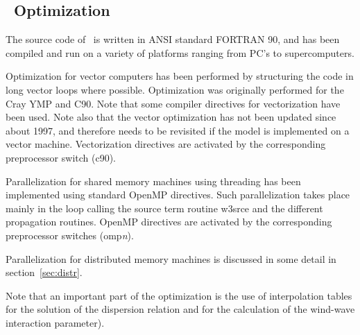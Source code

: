 

\vssub
\subsection{~Optimization} \label{sec:optim}
\vssub

The source code of \ws\ is written in ANSI standard FORTRAN 90, and has been
compiled and run on a variety of platforms ranging from PC's to
supercomputers.

Optimization for vector computers has been performed by structuring the code
in long vector loops where possible. Optimization was originally performed for
the Cray YMP and C90. Note that some compiler directives for vectorization
have been used. Note also that the vector optimization has not been updated
since about 1997, and therefore needs to be revisited if the model is
implemented on a vector machine. Vectorization directives are activated by the
corresponding preprocessor switch ({\F c90}).

Parallelization for shared memory machines using threading has been
implemented using standard OpenMP directives. Such parallelization takes place
mainly in the loop calling the source term routine {\F w3srce} and the
different propagation routines. OpenMP directives are activated by the
corresponding preprocessor switches ({\F omp}{\it n}).

Parallelization for distributed memory machines is discussed in some detail in
section~\ref{sec:distr}.

Note that an important part of the optimization is the use of interpolation
tables for the solution of the dispersion relation and for the calculation of
the wind-wave interaction parameter).
